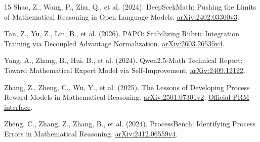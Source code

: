 \documentclass{article}
\begin{document}
\begin{thebibliography}{15}
Shao, Z., Wang, P., Zhu, Q., et al. (2024).
DeepSeekMath: Pushing the Limits of Mathematical Reasoning in Open Language Models.
\href{https://arxiv.org/abs/2402.03300v3}{arXiv:2402.03300v3}.

Tan, Z., Yu, Z., Lin, B., et al. (2026).
PAPO: Stabilizing Rubric Integration Training via Decoupled Advantage Normalization.
\href{https://arxiv.org/abs/2603.26535v4}{arXiv:2603.26535v4}.

Yang, A., Zhang, B., Hui, B., et al. (2024).
Qwen2.5-Math Technical Report: Toward Mathematical Expert Model via Self-Improvement.
\href{https://arxiv.org/abs/2409.12122}{arXiv:2409.12122}.

Zhang, Z., Zheng, C., Wu, Y., et al. (2025).
The Lessons of Developing Process Reward Models in Mathematical Reasoning.
\href{https://arxiv.org/abs/2501.07301v2}{arXiv:2501.07301v2}.
\href{https://huggingface.co/Qwen/Qwen2.5-Math-PRM-7B}{Official PRM interface}.

Zheng, C., Zhang, Z., Zhang, B., et al. (2024).
ProcessBench: Identifying Process Errors in Mathematical Reasoning.
\href{https://arxiv.org/abs/2412.06559v4}{arXiv:2412.06559v4}.
\end{thebibliography}
\end{document}
